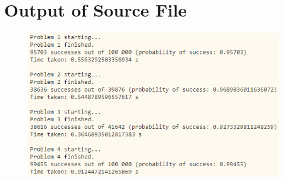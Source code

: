 \documentclass{article}
\begin{document}
\pagebreak

\section{Output of Source File}
\begin{figure}[H]
    \centering
    \includegraphics[width=\textwidth]{Images/output}
    \label{output}
\end{figure}
\end{document}
